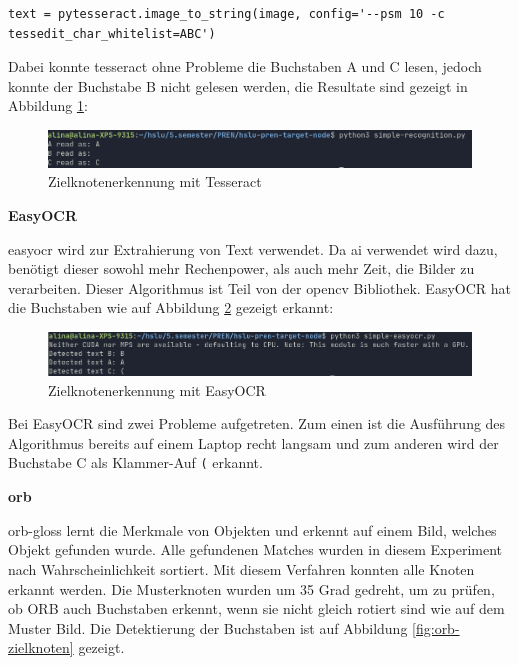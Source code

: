 \begin{verbatim}
text = pytesseract.image_to_string(image, config='--psm 10 -c
tessedit_char_whitelist=ABC')
\end{verbatim}

Dabei konnte \gls{tesseract} ohne Probleme die Buchstaben A und C lesen, jedoch konnte der Buchstabe B nicht gelesen werden, die Resultate sind gezeigt in Abbildung \ref{fig:zielknoten-tesseract}:

\begin{figure}[H]
\centering
\includegraphics[width=\linewidth]{assets/informatik-prototyp/opencv/target_node_detection/tesseract.png} 
\caption{Zielknotenerkennung mit Tesseract}
\label{fig:zielknoten-tesseract}
\end{figure}

\textbf{EasyOCR}

\gls{easyocr} wird zur Extrahierung von Text verwendet. Da \acrshort{ai} verwendet wird dazu, benötigt dieser sowohl mehr Rechenpower, als auch mehr Zeit, die Bilder zu verarbeiten. Dieser Algorithmus ist Teil von der \gls{opencv} Bibliothek. EasyOCR hat die Buchstaben wie auf Abbildung \ref{fig:zielknoten-easyocr} gezeigt erkannt:

\begin{figure}[H]
\centering
\includegraphics[width=\linewidth]{assets/informatik-prototyp/opencv/target_node_detection/easyocr.png} 
\caption{Zielknotenerkennung mit EasyOCR}
\label{fig:zielknoten-easyocr}
\end{figure}

Bei EasyOCR sind zwei Probleme aufgetreten. Zum einen ist die Ausführung des Algorithmus bereits auf einem Laptop recht langsam und zum anderen wird der Buchstabe C als Klammer-Auf \verb|(| erkannt.

\textbf{\acrfull{orb}}

\gls{orb-gloss} lernt die Merkmale von Objekten und erkennt auf einem Bild, welches Objekt gefunden wurde. Alle gefundenen Matches wurden in diesem Experiment nach Wahrscheinlichkeit sortiert. Mit diesem Verfahren konnten alle Knoten erkannt werden. Die Musterknoten wurden um 35 Grad gedreht, um zu prüfen, ob ORB auch Buchstaben erkennt, wenn sie nicht gleich rotiert sind wie auf dem Muster Bild. Die Detektierung der Buchstaben ist auf Abbildung \ref{fig:orb-zielknoten} gezeigt.

